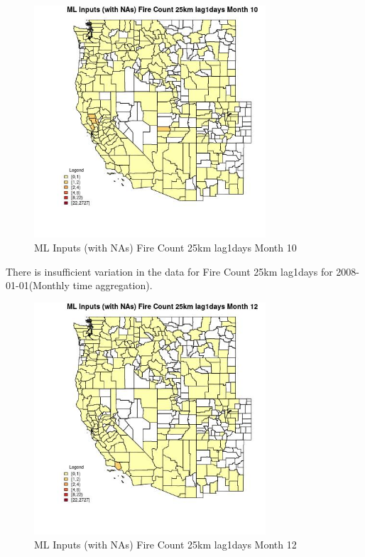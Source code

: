 \begin{figure} 
\centering  
\includegraphics[width=0.77\textwidth]{Code_Outputs/Report_ML_input_PM25_Step4_part_f_de_duplicated_aveswNAs_CountyFire_Count_25km_lag1daysmedianMonth10.jpg} 
\caption{\label{fig:Report_ML_input_PM25_Step4_part_f_de_duplicated_aveswNAsCountyFire_Count_25km_lag1daysmedianMonth10}ML Inputs (with NAs) Fire Count 25km lag1days Month 10} 
\end{figure} 
 

There is insufficient variation in the data for Fire Count 25km lag1days for 2008-01-01(Monthly time aggregation). 
 

\begin{figure} 
\centering  
\includegraphics[width=0.77\textwidth]{Code_Outputs/Report_ML_input_PM25_Step4_part_f_de_duplicated_aveswNAs_CountyFire_Count_25km_lag1daysmedianMonth12.jpg} 
\caption{\label{fig:Report_ML_input_PM25_Step4_part_f_de_duplicated_aveswNAsCountyFire_Count_25km_lag1daysmedianMonth12}ML Inputs (with NAs) Fire Count 25km lag1days Month 12} 
\end{figure} 
 

